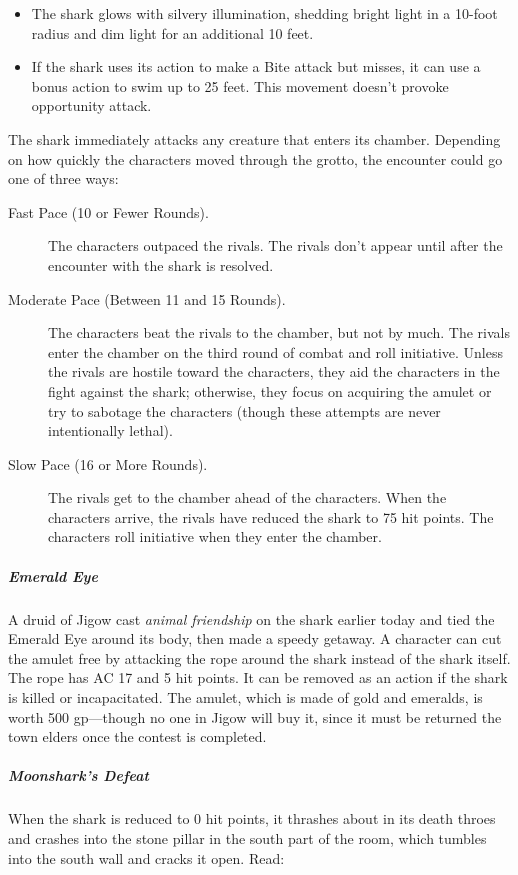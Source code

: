\documentclass[10pt,a4paper,twoside,bg=print,twocolumn,openany,nodeprecatedcode]{dndbook}
\begin{document}
\begin{itemize}
\item The shark glows with silvery illumination, shedding bright light in a 10-foot radius and dim light for an additional 10 feet.
\item If the shark uses its action to make a Bite attack but misses, it can use a bonus action to swim up to 25 feet. This movement doesn't provoke opportunity attack.
\end{itemize}

The shark immediately attacks any creature that enters its chamber. Depending on how quickly the characters moved through the grotto, the encounter could go one of three ways:


\begin{description}
\item[Fast Pace (10 or Fewer Rounds).]
The characters outpaced the rivals. The rivals don't appear until after the encounter with the shark is resolved.
\item[Moderate Pace (Between 11 and 15 Rounds).]
The characters beat the rivals to the chamber, but not by much. The rivals enter the chamber on the third round of combat and roll initiative. Unless the rivals are hostile toward the characters, they aid the characters in the fight against the shark; otherwise, they focus on acquiring the amulet or try to sabotage the characters (though these attempts are never intentionally lethal).
\item[Slow Pace (16 or More Rounds).]
The rivals get to the chamber ahead of the characters. When the characters arrive, the rivals have reduced the shark to 75 hit points. The characters roll initiative when they enter the chamber.
\end{description}

\subparagraph{Emerald Eye}
A druid of Jigow cast \textit{animal friendship} on the shark earlier today and tied the Emerald Eye around its body, then made a speedy getaway. A character can cut the amulet free by attacking the rope around the shark instead of the shark itself. The rope has AC 17 and 5 hit points. It can be removed as an action if the shark is killed or incapacitated. The amulet, which is made of gold and emeralds, is worth 500 gp—though no one in Jigow will buy it, since it must be returned the town elders once the contest is completed.

\subparagraph{Moonshark's Defeat}
When the shark is reduced to 0 hit points, it thrashes about in its death throes and crashes into the stone pillar in the south part of the room, which tumbles into the south wall and cracks it open. Read:
\end{document}
